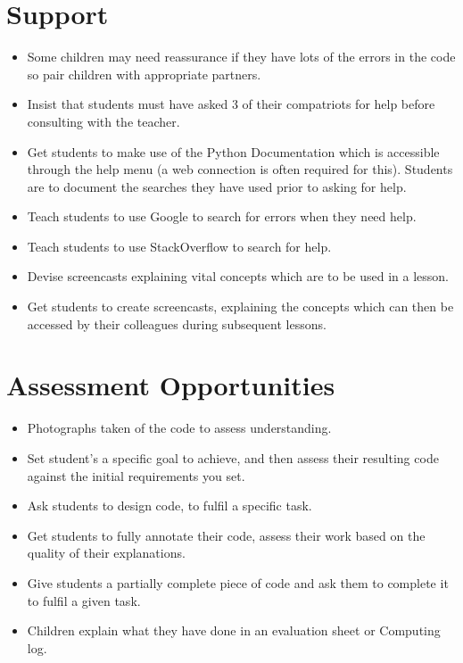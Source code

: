 \documentclass{geocraft-lesson-plan}
\begin{document}
\section*{Support}
\begin{itemize}
\item Some children may need reassurance if they have lots of the errors in the code so pair children with appropriate
  partners.
\item Insist that students must have asked 3 of their compatriots for help before consulting with the teacher.  
\item Get students to make use of the Python Documentation which is accessible through the help menu (a web connection
  is often required for this). Students are to document the searches they have used prior to asking for help.
\item Teach students to use Google to search for errors when they need help.
\item Teach students to use StackOverflow to search for help.
\item Devise screencasts explaining vital concepts which are to be used in a lesson.
\item Get students to create screencasts, explaining the concepts which can then be accessed by their colleagues during
  subsequent lessons. 
\end{itemize}

\section*{Assessment Opportunities}
\begin{itemize}
\item Photographs taken of the code to assess understanding. 
\item Set student's a specific goal to achieve, and then assess their resulting code against the initial requirements
  you set.
\item Ask students to design code, to fulfil a specific task.
\item Get students to fully annotate their code, assess their work based on the quality of their explanations.
\item Give students a partially complete piece of code and ask them to complete it to fulfil a given task.
\item Children explain what they have done in an evaluation sheet or Computing log.  
\end{itemize}

\end{document}
